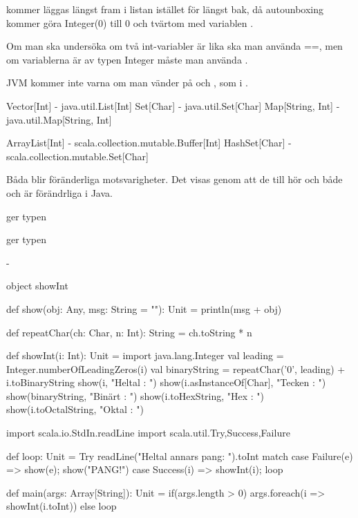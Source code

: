 \Subtask  {}

 kommer läggas längst fram i listan istället för längst bak, då autounboxing kommer göra Integer(0) till 0 och tvärtom med variablen .

\Subtask  Om man ska undersöka om två int-variabler är lika ska man använda ==, men om variablerna är av typen Integer måste man använda .

JVM kommer inte varna om man vänder på  och , som i .


\Task     %

\Subtask  Vector[Int] - java.util.List[Int]
Set[Char] - java.util.Set[Char]
Map[String, Int] - java.util.Map[String, Int]

\Subtask  ArrayList[Int] - scala.collection.mutable.Buffer[Int]
HashSet[Char] - scala.collection.mutable.Set[Char]

Båda blir föränderliga motsvarigheter. Det visas genom att de till hör  och både  och  är förändrliga i Java.

\Subtask  {}

\Subtask  {} ger typen 

 ger typen 

\Subtask  -


\Task

\begin{Code}[numbers=left]
object showInt {
  def show(obj: Any, msg: String = ""): Unit = println(msg + obj)

  def repeatChar(ch: Char, n: Int): String = ch.toString * n

  def showInt(i: Int): Unit = {
    import java.lang.Integer
    val leading = Integer.numberOfLeadingZeros(i)
    val binaryString = repeatChar('0', leading) + i.toBinaryString
    show(i,               "Heltal : ")
    show(i.asInstanceOf[Char],         "Tecken : ")
    show(binaryString,    "Binärt : ")
    show(i.toHexString,   "Hex    : ")
    show(i.toOctalString, "Oktal  : ")
  }


  import scala.io.StdIn.readLine
  import scala.util.{Try,Success,Failure}

  def loop: Unit =
    Try { readLine("Heltal annars pang: ").toInt } match {
      case Failure(e) => show(e); show("PANG!")
      case Success(i) => showInt(i); loop
    }

  def main(args: Array[String]): Unit =
    if(args.length > 0) args.foreach(i => showInt(i.toInt))
    else loop
}
\end{Code}


